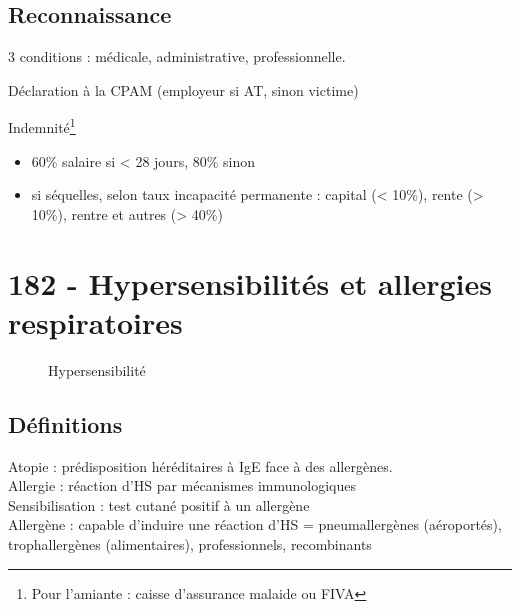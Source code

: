 \subsection{Reconnaissance}
3 conditions : médicale, administrative, professionnelle. 

Déclaration à la CPAM (employeur si AT, sinon victime)

Indemnité\footnote{Pour l'amiante : caisse d'assurance malaide ou FIVA}
\begin{itemize}
\item 60\% salaire si < 28 jours, 80\% sinon
\item si séquelles, selon taux incapacité permanente : capital (< 10\%), rente
  (> 10\%), rentre et autres (> 40\%)
\end{itemize}

\section{182 - Hypersensibilités et allergies respiratoires}%
\label{sec:182_hypersensibilites_et_allergies_respiratoires}

\begin{figure}[htpb]
  \centering
  \caption{Hypersensibilité}
\end{figure}
\subsection{Définitions}%
Atopie : prédisposition héréditaires à IgE face à des allergènes.\\
Allergie : réaction d'HS par mécanismes immunologiques\\
Sensibilisation : test cutané positif à un allergène\\
Allergène : capable d'induire une réaction d'HS = pneumallergènes (aéroportés),
trophallergènes (alimentaires), professionnels, recombinants

